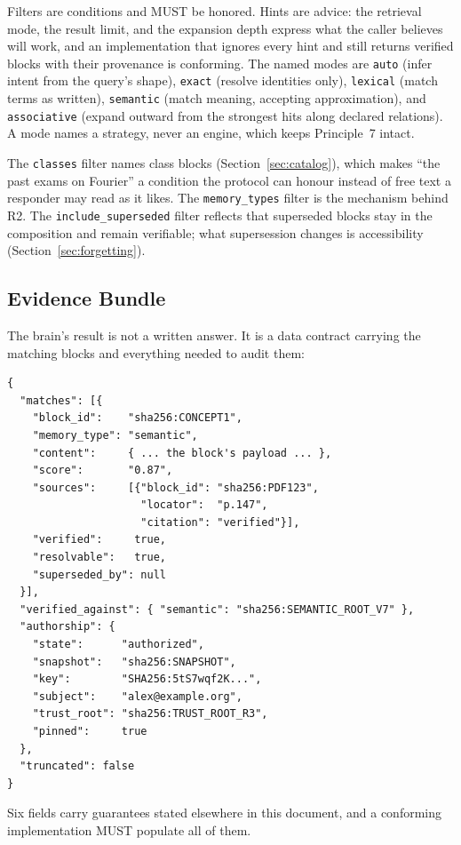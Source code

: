 \documentclass[11pt,a4paper]{article}
\begin{document}
Filters are conditions and MUST be honored. Hints are advice: the retrieval
mode, the result limit, and the expansion depth express what the caller
believes will work, and an implementation that ignores every hint and still
returns verified blocks with their provenance is conforming. The named modes are \texttt{auto} (infer intent from the query's shape),
\texttt{exact} (resolve identities only), \texttt{lexical} (match terms as
written), \texttt{semantic} (match meaning, accepting approximation), and
\texttt{associative} (expand outward from the strongest hits along declared
relations). A mode names a strategy, never an engine, which keeps Principle~7
intact.

The \texttt{classes} filter names class blocks (Section~\ref{sec:catalog}),
which makes ``the past exams on Fourier'' a condition the protocol can honour
instead of free text a responder may read as it likes. The
\texttt{memory\_types} filter is the mechanism behind R2. The
\texttt{include\_superseded} filter reflects that superseded blocks stay in
the composition and remain verifiable; what supersession changes is
accessibility (Section~\ref{sec:forgetting}).

\subsection{Evidence Bundle}
\label{sec:evidence-bundle}

The brain's result is not a written answer. It is a data contract carrying the
matching blocks and everything needed to audit them:
\begin{verbatim}
{
  "matches": [{
    "block_id":    "sha256:CONCEPT1",
    "memory_type": "semantic",
    "content":     { ... the block's payload ... },
    "score":       "0.87",
    "sources":     [{"block_id": "sha256:PDF123",
                     "locator":  "p.147",
                     "citation": "verified"}],
    "verified":     true,
    "resolvable":   true,
    "superseded_by": null
  }],
  "verified_against": { "semantic": "sha256:SEMANTIC_ROOT_V7" },
  "authorship": {
    "state":      "authorized",
    "snapshot":   "sha256:SNAPSHOT",
    "key":        "SHA256:5tS7wqf2K...",
    "subject":    "alex@example.org",
    "trust_root": "sha256:TRUST_ROOT_R3",
    "pinned":     true
  },
  "truncated": false
}
\end{verbatim}

Six fields carry guarantees stated elsewhere in this document, and a
conforming implementation MUST populate all of them.
\end{document}
